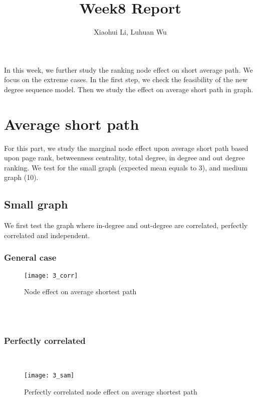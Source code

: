 \documentclass[10pt,english]{article}\usepackage{graphicx, color}
\numberwithin{equation}{section}
\numberwithin{figure}{section}
\begin{document}
\title{Week8 Report}


\author{Xiaohui Li, Luhuan Wu}

\maketitle


In this week, we further study the ranking node effect on short average path. We focus on the extreme cases. In the first step, we check the feasibility of the new degree sequence model. Then we study the effect on average short path in graph. 

\section{Average short path}
For this part, we study the marginal node effect upon average short path based upon page rank, betweenness centrality, total degree, in degree and out degree ranking. We test for the small graph (expected mean equals to 3), and medium graph (10).\\
\subsection{Small graph}
We first test the graph where in-degree and out-degree are correlated, perfectly correlated and independent. \\
\subsubsection{General case}
\begin{figure}[htbp]
\centering\texttt{[image: 3\_corr]}
\caption{Node effect on average shortest path}
\end{figure}
\quad\\
\quad\\


\subsubsection{Perfectly correlated}
\quad\\

\begin{figure}[htbp]
\centering\texttt{[image: 3\_sam]}
\caption{Perfectly correlated node effect on average shortest path}
\end{figure}
\quad\\
\end{document}
